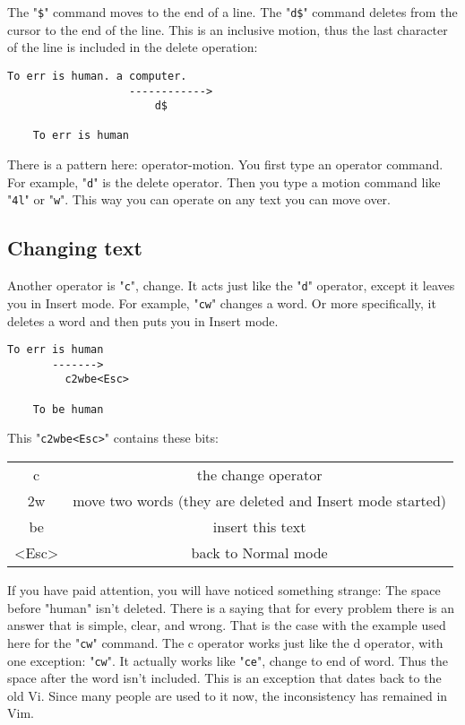 The "\texttt{\$}" command moves to the end of a line.
The "\texttt{d\$}" command deletes from the cursor to the end of the line.
This is an inclusive motion, thus the last character of the line is included in the delete operation:

\begin{Verbatim}[samepage=true]
    To err is human. a computer. 
                   ------------>
                       d$

    To err is human 
\end{Verbatim}

There is a pattern here: operator-motion.
You first type an operator command.
For example, "\texttt{d}" is the delete operator.
Then you type a motion command like "\texttt{4l}" or "\texttt{w}".
This way you can operate on any text you can move over.

\subsection{Changing text}

Another operator is "\texttt{c}", change.
It acts just like the "\texttt{d}" operator, except it leaves you in Insert mode.
For example, "\texttt{cw}" changes a word.
Or more specifically, it deletes a word and then puts you in Insert mode.

\begin{Verbatim}[samepage=true]
    To err is human 
       ------->
         c2wbe<Esc>

    To be human 
\end{Verbatim}

This "\texttt{c2wbe<Esc>}" contains these bits:
\begin{center}
\begin{tabular}{c c}
				c & the change operator\\
				2w & move two words (they are deleted and Insert mode started)\\
				be & insert this text\\
				<Esc> & back to Normal mode\\
\end{tabular}
\end{center}

If you have paid attention, you will have noticed something strange: The space before "human" isn't deleted.
There is a saying that for every problem there is an answer that is simple, clear, and wrong.
That is the case with the example used here for the "\texttt{cw}" command.
The c operator works just like the d operator, with one exception: "\texttt{cw}".
It actually works like "\texttt{ce}", change to end of word.
Thus the space after the word isn't included.
This is an exception that dates back to the old Vi.
Since many people are used to it now, the inconsistency has remained in Vim.

